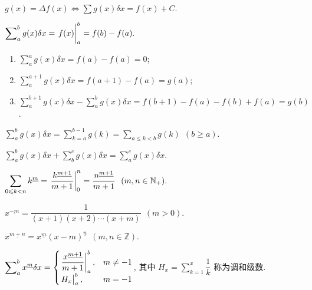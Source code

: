 \begin{definition}[不定和]
    $\displaystyle g(x)=\varDelta f(x)\iff \sum g(x)\delta x=f(x)+C.$
\end{definition}

\begin{definition}[定和]
    $\displaystyle \sum\nolimits_{a}^{b} g(x)\delta x=\eval{f(x)}_{a}^{b}=f(b)-f(a).$
\end{definition}

\begin{enumerate}[label=(\arabic{*})]
    \item $\displaystyle \sum\nolimits_a^a g(x)\delta x=f(a)-f(a)=0$;
    \item $\displaystyle \sum\nolimits_a^{a+1} g(x)\delta x=f(a+1)-f(a)=g(a)$;
    \item $\displaystyle \sum\nolimits_{a}^{b+1}g(x)\delta x-\sum\nolimits_{a}^{b}g(x)\delta x=f(b+1)-f(a)-f(b)+f(a)=g(b)$.
\end{enumerate}

\begin{theorem}
    $\displaystyle \sum\nolimits_{a}^{b}g(x)\delta x=\sum_{k=a}^{b-1}g(k)=\sum_{a\leqslant k<b}g(k)~~(b\geqslant a).$
\end{theorem}

\begin{theorem}
    $\displaystyle \sum\nolimits_{a}^{b}g(x)\delta x+\sum\nolimits_b^c g(x)\delta x=\sum\nolimits_a^cg(x)\delta x.$
\end{theorem}

\begin{theorem}
    $\displaystyle \sum_{0\leqslant k<n}k^{\underline{m}}=\eval{\dfrac{k^{\underline{m+1}}}{m+1}}_{0}^{n}=\dfrac{n^{\underline{m+1}}}{m+1}~~(m,n\in\mathbb{N}_+).$
\end{theorem}

\begin{definition}
    $x^{\underline{-m}}=\dfrac{1}{(x+1)(x+2)\cdots(x+m)}~~(m>0).$
\end{definition}

\begin{theorem}
    $x^{\underline{m+n}}=x^{\underline{m}}(x-m)^{\underline{n}} ~~(m,n\in\mathbb{Z}).$
\end{theorem}

\begin{theorem}
    $\displaystyle\sum\nolimits_a^b x^{\underline{m}}\delta x=\begin{cases}
            \eval{\dfrac{x^{\underline{m+1}}}{m+1}}_{a}^{b}, & m\neq -1 \\
            \eval{H_x}_{a}^{b},                              & m=-1
        \end{cases}$,
    其中 $\displaystyle H_x=\sum_{k=1}^{x}\dfrac{1}{k}$ 称为调和级数.
\end{theorem}

